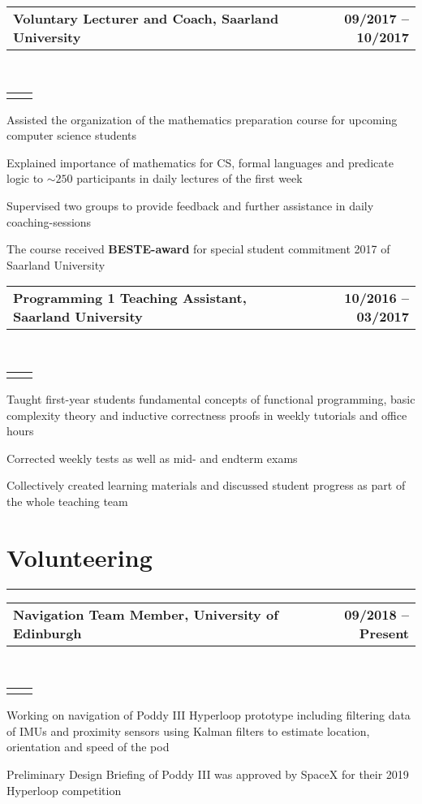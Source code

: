 \documentclass[]{deedy-resume}
\makeatletter
\newcommand{\headerrow}[2]
{\begin{tabular*}{\linewidth}{l@{\extracolsep{\fill}}r}
	\fontspec{Helvetica}\fontsize{12pt}{12pt}\selectfont\bfseries{\color{subheadings}#1} &
	\fontspec{Helvetica}\fontsize{12pt}{12pt}\selectfont\bfseries{\color{subheadings}#2} \\
\end{tabular*}}
\newcommand{\locationrow}[2]
{\begin{tabular*}{\linewidth}{l@{\extracolsep{\fill}}r}
        \color{headings}\scshape\fontspec{Heiti TC Medium}\fontsize{10pt}{12pt}\selectfont{#1}  &
        \color{headings}\scshape\fontspec{Heiti TC Medium}\fontsize{10pt}{12pt}\selectfont{#2}  \\
\end{tabular*}}
\makeatother
\begin{document}
\noindent
\headerrow{Voluntary Lecturer and Coach, Saarland University}{09/2017 -- 10/2017}
\\
\locationrow{Mathematics Preparation Course}{}
\begin{tightitemize}{1.7em}
    \item Assisted the organization of the mathematics preparation course for upcoming computer science students%
    \item Explained importance of mathematics for CS, formal languages and predicate logic to $\sim250$ participants in daily lectures of the first week
    \item Supervised two groups to provide feedback and further assistance in daily coaching-sessions
    \item The course received \textbf{BESTE-award} for special student commitment 2017 of Saarland University
\end{tightitemize}
\largesectionsep

\noindent
\headerrow{Programming 1 Teaching Assistant, Saarland University}{10/2016 -- 03/2017}
\\
\locationrow{Dependable Systems and Software Group}{}
\begin{tightitemize}{1.7em}
    \item Taught first-year students fundamental concepts of functional programming, basic complexity theory and inductive correctness proofs in weekly tutorials and office hours
    \item Corrected weekly tests as well as mid- and endterm exams
    \item Collectively created learning materials and discussed student progress as part of the whole teaching team
\end{tightitemize}
\largesectionsep


\section*{Volunteering}
\hrule
\vspace{0.4em}

\noindent
\headerrow{Navigation Team Member, University of Edinburgh}{09/2018 -- Present}
\\
\locationrow{HYPED -- University of Edinburgh Hyperloop Society}{}
\begin{tightitemize}{1.7em}
    \item Working on navigation of Poddy III Hyperloop prototype including filtering data of IMUs and proximity sensors 
    using Kalman filters to estimate location, orientation and speed of the pod
    \item Preliminary Design Briefing of Poddy III was approved by SpaceX for their 2019 Hyperloop competition
\end{tightitemize}
\largesectionsep
\end{document}
